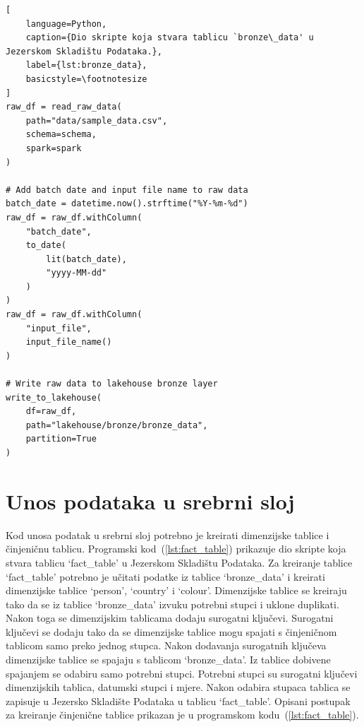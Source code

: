 \begin{lstlisting}[
    language=Python, 
    caption={Dio skripte koja stvara tablicu `bronze\_data' u Jezerskom Skladištu Podataka.}, 
    label={lst:bronze_data},
    basicstyle=\footnotesize
]
raw_df = read_raw_data(
    path="data/sample_data.csv",
    schema=schema,
    spark=spark
)

# Add batch date and input file name to raw data
batch_date = datetime.now().strftime("%Y-%m-%d")
raw_df = raw_df.withColumn(
    "batch_date",
    to_date(
        lit(batch_date),
        "yyyy-MM-dd"
    )
)
raw_df = raw_df.withColumn(
    "input_file",
    input_file_name()
)

# Write raw data to lakehouse bronze layer
write_to_lakehouse(
    df=raw_df,
    path="lakehouse/bronze/bronze_data",
    partition=True
)
\end{lstlisting}

\section{Unos podataka u srebrni sloj} \label{section:unos_podataka_u_srebrni_sloj}

Kod unosa podatak u srebrni sloj potrebno je kreirati dimenzijske tablice i 
činjeničnu tablicu. Programski kod~(\ref{lst:fact_table}) prikazuje dio
skripte koja stvara tablicu `fact\_table' u Jezerskom Skladištu Podataka. Za
kreiranje tablice `fact\_table' potrebno je učitati podatke iz tablice
`bronze\_data' i kreirati dimenzijske tablice `person', `country' i `colour'. 
Dimenzijske tablice se kreiraju tako da se iz tablice `bronze\_data' izvuku
potrebni stupci i uklone duplikati. Nakon toga se dimenzijskim tablicama dodaju
surogatni ključevi. Surogatni ključevi se dodaju tako da se dimenzijske tablice
mogu spajati s činjeničnom tablicom samo preko jednog stupca. Nakon dodavanja
surogatnih ključeva dimenzijske tablice se spajaju s tablicom `bronze\_data'. 
Iz tablice dobivene spajanjem se odabiru samo potrebni stupci. Potrebni stupci
su surogatni ključevi dimenzijskih tablica, datumski stupci i mjere. Nakon
odabira stupaca tablica se zapisuje u Jezersko Skladište Podataka u tablicu
`fact\_table'. Opisani postupak za kreiranje činjenične tablice prikazan je u
programskom kodu~(\ref{lst:fact_table}). 

